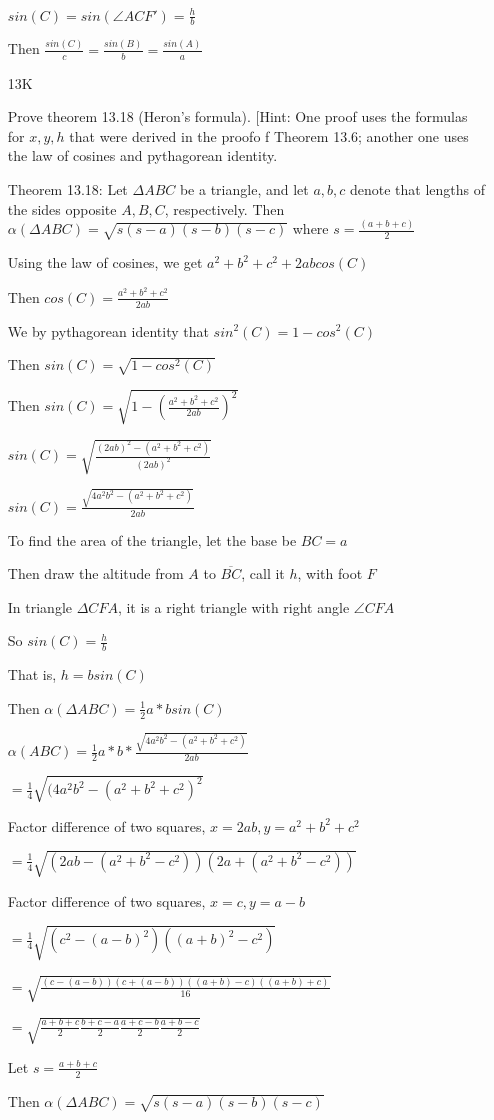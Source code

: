 \documentclass[11pt]{article}
\newcommand{\segment}[1]{\overline{#1}}
\begin{document}
\begin{itemize}
	$sin(C) = sin(\angle ACF') = \frac{h}{b}$

	Then $\frac{sin(C)}{c} = \frac{sin(B)}{b} = \frac{sin(A)}{a}$

	\item[13K]

	Prove theorem 13.18 (Heron's formula). [Hint: One proof uses the formulas for $x,y,h$ that were derived in the proofo f Theorem 13.6; another one uses the law of cosines and pythagorean identity.

	Theorem 13.18: Let $\Delta ABC$ be a triangle, and let $a,b,c$ denote that lengths of the sides opposite $A,B,C$, respectively. Then $\alpha(\Delta ABC) = \sqrt{s(s-a)(s-b)(s-c)}$ where $s = \frac{(a+b+c)}{2}$

	Using the law of cosines, we get $a^2 + b^2 + c^2 + 2abcos(C)$

	Then $cos(C) = \frac{a^2 + b^2 + c^2}{2ab}$

	We by pythagorean identity that $sin^2 (C) = 1 - cos^2(C)$

	Then $sin(C) = \sqrt{1-cos^2(C)}$

	Then $sin(C) = \sqrt{1-(\frac{a^2+b^2+c^2}{2ab})^2}$

	$sin(C) = \sqrt{\frac{(2ab)^2 - (a^2 + b^2 + c^2)}{(2ab)^2}}$

	$sin(C) = \frac{\sqrt{4a^2b^2 - (a^2 + b^2 + c^2)}}{2ab}$
	
	To find the area of the triangle, let the base be $BC = a$

	Then draw the altitude from $A$ to $\segment{BC}$, call it $h$, with foot $F$

	In triangle $\Delta CFA$, it is a right triangle with right angle $\angle CFA$

	So $sin(C) = \frac{h}{b}$

	That is, $h = bsin(C)$

	Then $\alpha(\Delta ABC) = \frac{1}{2} a*bsin(C)$

	$\alpha(ABC)  =\frac{1}{2}a*b*\frac{\sqrt{4a^2b^2 - (a^2 + b^2 + c^2)}}{2ab}$

	$=\frac{1}{4} \sqrt{(4a^2b^2 - (a^2 + b^2 + c^2)^2}$

	Factor difference of two squares, $x = 2ab, y = a^2 + b^2 + c^2$

	$=\frac{1}{4} \sqrt{(2ab - (a^2 + b^2 - c^2))(2a+(a^2 + b^2 - c^2))}$

	Factor difference of two squares, $x = c, y = a-b$

	$=\frac{1}{4}\sqrt{(c^2 - (a-b)^2)((a+b)^2 - c^2)}$

	$=\sqrt{\frac{(c-(a-b))(c+(a-b))((a+b)-c)((a+b)+c)}{16}}$

	$=\sqrt{\frac{a+b+c}{2}\frac{b+c-a}{2}\frac{a+c-b}{2}\frac{a+b-c}{2}}$

	Let $s = \frac{a+b+c}{2}$

	Then $\alpha(\Delta ABC) = \sqrt{s(s-a)(s-b)(s-c)}$

\end{itemize}
\end{document}
